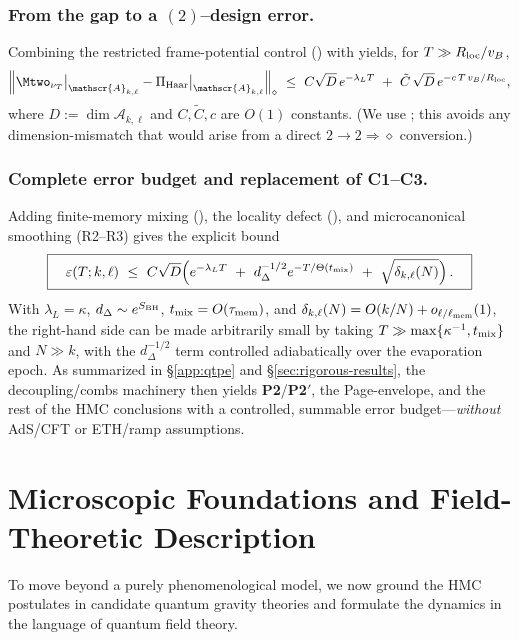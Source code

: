 \documentclass[11pt,a4paper]{article}
\newcommand{\Ptwo}{\textbf{P2}\xspace}
\newcommand{\PtwoPrime}{\textbf{P2$'$}\xspace}
\newcommand{\HMC}{\textsc{HMC}\xspace}
\theoremstyle{plain}
\theoremstyle{definition}
\theoremstyle{remark}
\begin{document}
\subsubsection{From the gap to a $(2)$--design error.}
Combining the restricted frame-potential control () with  yields, for $T\gg R_{\rm loc}/v_B$,
\begin{equation}
\label{eq:design-2-eh}
\Big\| \Mtwo_{\nu_T}\big|_{\mathscr{A}_{k,\ell}} - \Pi_{\rm Haar}\big|_{\mathscr{A}_{k,\ell}} \Big\|_{\diamond}
\ \le\ C\sqrt{D}\,e^{-\lambda_L T}\ +\ \tilde C\,\sqrt{D}\,e^{-c\, T\, v_B/R_{\rm loc}},
\end{equation}
where $D:=\dim\mathscr{A}_{k,\ell}$ and $C,\tilde C,c$ are $O(1)$ constants.  (We use ; this avoids any dimension-mismatch that would arise from a direct $2{\to}2\Rightarrow \diamond$ conversion.)

\subsubsection{Complete error budget and replacement of C1--C3.}
Adding finite-memory mixing (), the locality defect (), and microcanonical smoothing (R2--R3) gives the explicit bound
\begin{equation}
\label{eq:epsilon-budget-final}
\boxed{\quad
\varepsilon(T;k,\ell)\ \le\ C\sqrt{D}\Big(e^{-\lambda_L T}\ +\ d_\Delta^{-1/2} e^{-T/\Theta(t_{\rm mix})}\ +\ \sqrt{\delta_{k,\ell}(N)}\Big)\,.
\quad}
\end{equation}
With $\lambda_L=\kappa$, $d_\Delta\sim e^{S_{\rm BH}}$, $t_{\rm mix}=O(\tau_{\rm mem})$, and $\delta_{k,\ell}(N)=O(k/N)+o_{\ell/\ell_{\rm mem}}(1)$, the right-hand side can be made arbitrarily small by taking $T\gg \max\{\kappa^{-1},t_{\rm mix}\}$ and $N\gg k$, with the $d_\Delta^{-1/2}$ term controlled adiabatically over the evaporation epoch.
As summarized in \S\ref{app:qtpe} and \S\ref{sec:rigorous-results}, the decoupling/combs machinery then yields \Ptwo/\PtwoPrime, the Page-envelope, and the rest of the HMC conclusions with a controlled, summable error budget---\emph{without} AdS/CFT or ETH/ramp assumptions.

\section{Microscopic Foundations and Field-Theoretic Description}\label{sec:microscopic_foundations}\label{sec:microscopic}
To move beyond a purely phenomenological model, we now ground the \HMC{} postulates in candidate quantum gravity theories and formulate the dynamics in the language of quantum field theory.
\end{document}
